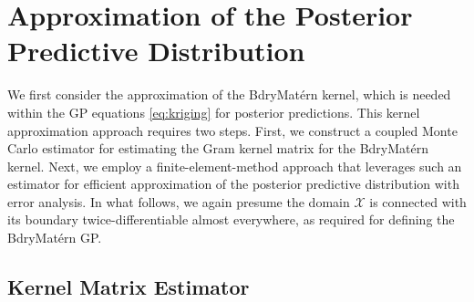 \documentclass[aos,preprint]{imsart}
\theoremstyle{plain}
\theoremstyle{remark}
\begin{document}
\section{Approximation of the Posterior Predictive Distribution}
\label{sec:kernel_approx}


We first consider the approximation of the BdryMat\'ern kernel, which is needed within the GP equations \eqref{eq:kriging} for posterior predictions. This kernel approximation approach requires two steps. First, we construct a coupled Monte Carlo estimator for estimating the Gram kernel matrix for the BdryMat\'ern kernel. Next, we employ a finite-element-method approach that leverages such an estimator for efficient approximation of the posterior predictive distribution with error analysis. In what follows, we again presume the domain $\mathcal{X}$ is connected with its boundary twice-differentiable almost everywhere, as required for defining the BdryMat\'ern GP.


\subsection{Kernel Matrix Estimator}\label{sec:kermat}
\end{document}
